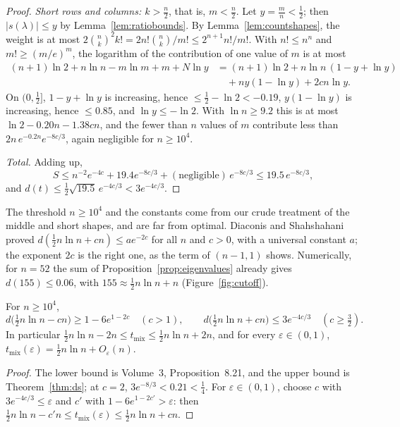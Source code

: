 \begin{proof}
\emph{Short rows and columns: $k>\frac n2$}, that is, $m<\frac n2$. Let $y=\frac mn<\frac12$; then $|s(\lambda)|\le y$ by Lemma~\ref{lem:ratiobounds}. By Lemma~\ref{lem:countshapes}, the weight is at most $2\binom nk^2k!=2n!\binom nk/m!\le2^{n+1}n!/m!$. With $n!\le n^n$ and
$m!\ge(m/e)^m$, the logarithm of the contribution of one value of $m$ is at most
\[
\begin{aligned}(n+1)\ln2+n\ln n-m\ln m+m+N\ln y&=(n+1)\ln2+n\ln n\,(1-y+\ln y)\\&\quad+ny(1-\ln y)+2cn\ln y.\end{aligned}
\]
On $(0,\frac12]$, $1-y+\ln y$ is increasing, hence $\le\frac12-\ln2<-0.19$, $y(1-\ln y)$ is increasing, hence $\le0.85$, and $\ln y\le-\ln2$. With $\ln n\ge9.2$ this is at most $\ln2-0.20n-1.38cn$, and the fewer than $n$ values of $m$ contribute
less than $2n\,e^{-0.2n}e^{-8c/3}$, again negligible for $n\ge10^4$.

\emph{Total.} Adding up,
\[
S\le n^{-2}e^{-4c}+19.4e^{-8c/3}+(\text{negligible})\,e^{-8c/3}\le19.5\,e^{-8c/3},
\]
and $d(t)\le\frac12\sqrt{19.5}\,e^{-4c/3}<3e^{-4c/3}$.
\end{proof}

The threshold $n\ge10^4$ and the constants come from our crude treatment of the middle and short shapes, and are far from optimal. Diaconis and Shahshahani proved $d(\frac12n\ln n+cn)\le ae^{-2c}$ for all $n$ and $c>0$, with a universal constant $a$; the exponent $2c$
is the right one, as the term of $(n-1,1)$ shows. Numerically, for $n=52$ the sum of Proposition~\ref{prop:eigenvalues} already gives $d(155)\le0.06$, with $155\approx\frac12n\ln n+n$ (Figure~\ref{fig:cutoff}).

\begin{corollary}\label{cor:cutoff}
For $n\ge10^4$,
\[
d\bigl(\tfrac12n\ln n-cn\bigr)\ge1-6e^{1-2c}\quad(c>1),\qquad d\bigl(\tfrac12n\ln n+cn\bigr)\le3e^{-4c/3}\quad(c\ge\tfrac32).
\]
In particular $\frac12n\ln n-2n\le t_{\mathrm{mix}}\le\frac12n\ln n+2n$, and for every $\varepsilon\in(0,1)$, $t_{\mathrm{mix}}(\varepsilon)=\frac12n\ln n+O_\varepsilon(n)$.
\end{corollary}

\begin{proof}
The lower bound is Volume~3, Proposition~8.21, and the upper bound is Theorem~\ref{thm:ds}; at $c=2$, $3e^{-8/3}<0.21<\frac14$. For $\varepsilon\in(0,1)$, choose $c$ with $3e^{-4c/3}\le\varepsilon$ and $c'$ with $1-6e^{1-2c'}>\varepsilon$: then
$\frac12n\ln n-c'n\le t_{\mathrm{mix}}(\varepsilon)\le\frac12n\ln n+cn$.
\end{proof}

